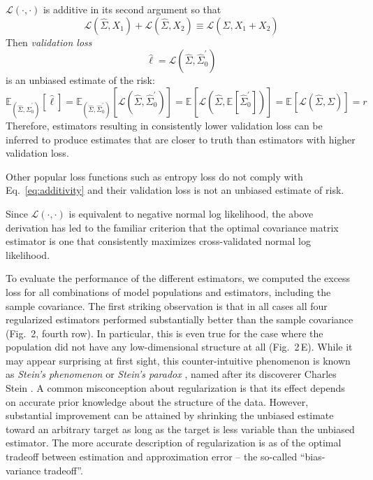 \documentclass[10pt]{article}
\newcommand{\loss}[1]{\mathcal L\left(#1\right)}
\newcommand{\E}[2][]{\mathbb E_{#1}\left[ #2\right]}    %
\begin{document}
$\loss{\cdot,\cdot}$ is additive in its second argument so that 
 \begin{equation}\label{eq:additivity}
 \loss{\hat\Sigma,X_1} + \loss{\hat\Sigma,X_2} \equiv \loss{\hat\Sigma,X_1+X_2}
 \end{equation}
Then \emph{validation loss}  
\begin{equation}\label{eq:validationLoss}
\hat \ell = \loss{\hat\Sigma,\hat\Sigma_0^\prime}
\end{equation}
is an unbiased estimate of the risk:
 \begin{equation}\label{eq:empiricalRisk}
\E[(\hat\Sigma, \hat\Sigma_0^\prime)] {\hat\ell} 
= \E[(\hat\Sigma, \hat\Sigma_0^\prime)]{\loss{\hat\Sigma,\hat\Sigma_0^\prime}}
= \E{\loss{\hat\Sigma,\E{\hat\Sigma_0^\prime}}}
= \E{\loss{\hat\Sigma,\Sigma}} = r
 \end{equation}
Therefore, estimators resulting in consistently lower validation loss can be inferred to produce estimates that are closer to truth than estimators with higher validation loss.

Other popular loss functions such as entropy loss do not comply with Eq.~\ref{eq:additivity} and their validation loss is not an unbiased estimate of risk.

Since $\loss{\cdot,\cdot}$ is equivalent to negative normal log likelihood, the above derivation has led to the familiar criterion that the optimal covariance matrix estimator is one that consistently maximizes cross-validated normal log likelihood.


To evaluate the performance of the different estimators, we computed the excess loss for all combinations of model populations and estimators, including the sample covariance. The first striking observation is that in all cases all four regularized estimators performed substantially better than the sample covariance (Fig.~2, fourth row). In particular, this is even true for the case where the population did not have any low-dimensional structure at all (Fig.~2\,E). While it may appear surprising at first sight, this counter-intuitive phenomenon is known as \emph{Stein's phenomenon} or \emph{Stein's paradox} \cite{Efron:1977}, named after its discoverer Charles Stein \cite{Stein:1956}. A common misconception about regularization is that its effect depends on accurate prior knowledge about the structure of the data. However, substantial improvement can be attained by shrinking the unbiased estimate toward an arbitrary target as long as the target is less variable than the unbiased estimator. The more accurate description of regularization is as of the optimal tradeoff between estimation and approximation error -- the so-called ``bias-variance tradeoff''.
\end{document}
